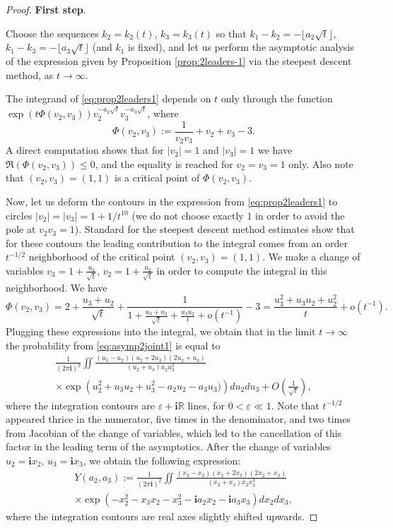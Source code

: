 \documentclass[10pt,a4paper]{amsart}
\def\R{\mathbb R}
\newcommand{\eps}{\varepsilon}
\newcommand{\ii}{{\mathbf i}}
\renewcommand\le{\leq}
\begin{document}
	\begin{proof}
		
		\textbf{First step}. 
		
		\smallskip
		
		Choose the sequences $k_2 = k_2(t)$, $k_3 = k_3 (t)$ so that $k_1 - k_2 = - \lfloor a_2 \sqrt{t} \rfloor$, $k_1 - k_3 =- \lfloor a_3 \sqrt{t} \rfloor$ (and $k_1$ is fixed), and
		let us perform the asymptotic analysis of the expression given by Proposition \ref{prop:2leaders-1} via the steepest descent method, as $t \to \infty$. 
		
		The integrand of \eqref{eq:prop2leaders1} depends on $t$ only through the function $\exp ( t \Phi (v_2,v_3)) v_2^{-a_2 \sqrt{t}} v_3^{-a_3 \sqrt{t}}$, where
		$$
		\Phi (v_2,v_3) := \frac{1}{v_2 v_3} + v_2 + v_3 - 3.
		$$
		A direct computation shows that for $|v_2|=1$ and $|v_3|=1$ we have $\Re \left( \Phi (v_2,v_3) \right) \le 0$, and the equality is reached for $v_2=v_3=1$ only. Also note that $(v_2,v_3)=(1,1)$ is a critical point of $\Phi (v_2,v_3)$. 
		
		Now, let us deform the contours in the expression from \eqref{eq:prop2leaders1} to circles $|v_2|=|v_3|=1 +1/ t^{10}$ (we do not choose exactly $1$ in order to avoid the pole at $v_2 v_3 =1$). Standard for the steepest descent method estimates show that for these contours the leading contribution to the integral comes from an order $t^{-1/2}$ neighborhood of the critical point $(v_2,v_3)=(1,1)$. 
		We make a change of variables $v_3 = 1+ \frac{u_3}{\sqrt{t}}$, $v_2 = 1+ \frac{u_2}{\sqrt{t}}$ in order to compute the integral in this neighborhood. We have
		$$
		\Phi (v_2,v_3) = 2 + \frac{u_3+u_2}{\sqrt{t}} + \frac{1}{1+\frac{u_3+u_2}{\sqrt{t}} + \frac{u_3 u_2}{t} + o(t^{-1}) } -3 = \frac{u_3^2+u_3 u_2 +u_2^2}{t} + o( t^{-1}).
		$$
		Plugging these expressions into the integral, we obtain that in the limit $t \to \infty$ the probability from \eqref{eq:asymp2joint1} is equal to
		\begin{multline*}
			\frac{1}{(2 \pi \ii)^2} \iint \frac{(u_3-u_2)(u_2 + 2 u_3)(2 u_2 + u_3)}{ (u_2 + u_3) u_2 u_3^3 } \\ \times \exp \left( u_2^2 + u_3 u_2 +u_3^2 - a_2 u_2 - a_3 u_3) \right) d u_2 d u_3 + O \left( \frac{1}{\sqrt{t}} \right),
		\end{multline*}
		where the integration contours are $\eps+ \ii \R$ lines, for $0 < \eps \ll 1$. Note that $t^{-1/2}$ appeared thrice in the numerator, five times in the denominator, and two times from Jacobian of the change of variables, which led to the cancellation of this factor in the leading term of the asymptotics.
		After the change of variables $u_2 = \ii x_2$, $u_3 = \ii x_3$, we obtain the following expression:
		\begin{multline*}
			Y(a_2,a_3) := \frac{1}{(2 \pi \ii)^2} \iint \frac{(x_3-x_2)(x_2 + 2 x_3)(2 x_2 + x_3)}{ (x_2 + x_3) x_2 x_3^3 } \\ \times \exp \left( - x_2^2 - x_3 x_2 - x_3^2 - \ii a_2 x_2 - \ii a_3 x_3 \right) d x_2 d x_3,
		\end{multline*}
		where the integration contours are real axes slightly shifted upwards.
		

\end{proof}
\end{document}
